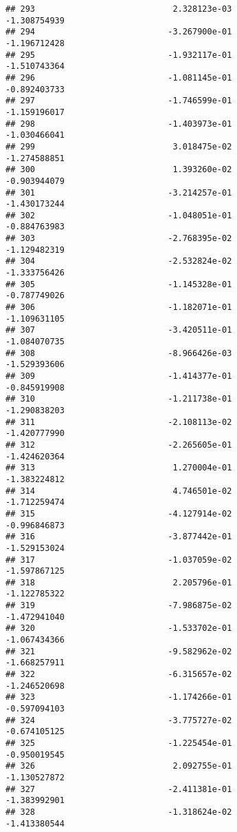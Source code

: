 \documentclass[
]{article}
\begin{document}
\begin{verbatim}
## 293                            2.328123e-03               -1.308754939
## 294                           -3.267900e-01               -1.196712428
## 295                           -1.932117e-01               -1.510743364
## 296                           -1.081145e-01               -0.892403733
## 297                           -1.746599e-01               -1.159196017
## 298                           -1.403973e-01               -1.030466041
## 299                            3.018475e-02               -1.274588851
## 300                            1.393260e-02               -0.903944079
## 301                           -3.214257e-01               -1.430173244
## 302                           -1.048051e-01               -0.884763983
## 303                           -2.768395e-02               -1.129482319
## 304                           -2.532824e-02               -1.333756426
## 305                           -1.145328e-01               -0.787749026
## 306                           -1.182071e-01               -1.109631105
## 307                           -3.420511e-01               -1.084070735
## 308                           -8.966426e-03               -1.529393606
## 309                           -1.414377e-01               -0.845919908
## 310                           -1.211738e-01               -1.290838203
## 311                           -2.108113e-02               -1.420777990
## 312                           -2.265605e-01               -1.424620364
## 313                            1.270004e-01               -1.383224812
## 314                            4.746501e-02               -1.712259474
## 315                           -4.127914e-02               -0.996846873
## 316                           -3.877442e-01               -1.529153024
## 317                           -1.037059e-02               -1.597867125
## 318                            2.205796e-01               -1.122785322
## 319                           -7.986875e-02               -1.472941040
## 320                           -1.533702e-01               -1.067434366
## 321                           -9.582962e-02               -1.668257911
## 322                           -6.315657e-02               -1.246520698
## 323                           -1.174266e-01               -0.597094103
## 324                           -3.775727e-02               -0.674105125
## 325                           -1.225454e-01               -0.950019545
## 326                            2.092755e-01               -1.130527872
## 327                           -2.411381e-01               -1.383992901
## 328                           -1.318624e-02               -1.413380544

\end{verbatim}
\end{document}
